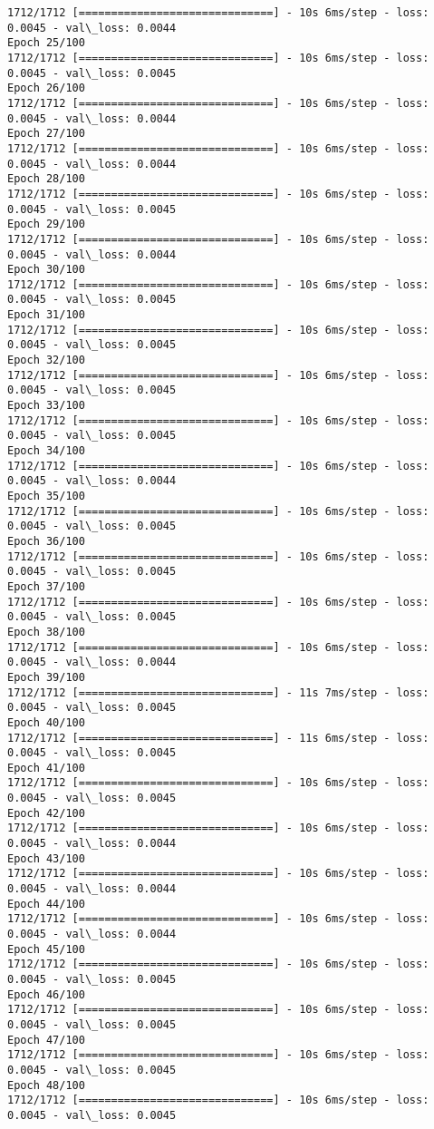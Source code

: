 \documentclass[11pt]{article}
\begin{document}
\begin{Verbatim}[commandchars=\\\{\}]
1712/1712 [==============================] - 10s 6ms/step - loss: 0.0045 - val\_loss: 0.0044
Epoch 25/100
1712/1712 [==============================] - 10s 6ms/step - loss: 0.0045 - val\_loss: 0.0045
Epoch 26/100
1712/1712 [==============================] - 10s 6ms/step - loss: 0.0045 - val\_loss: 0.0044
Epoch 27/100
1712/1712 [==============================] - 10s 6ms/step - loss: 0.0045 - val\_loss: 0.0044
Epoch 28/100
1712/1712 [==============================] - 10s 6ms/step - loss: 0.0045 - val\_loss: 0.0045
Epoch 29/100
1712/1712 [==============================] - 10s 6ms/step - loss: 0.0045 - val\_loss: 0.0044
Epoch 30/100
1712/1712 [==============================] - 10s 6ms/step - loss: 0.0045 - val\_loss: 0.0045
Epoch 31/100
1712/1712 [==============================] - 10s 6ms/step - loss: 0.0045 - val\_loss: 0.0045
Epoch 32/100
1712/1712 [==============================] - 10s 6ms/step - loss: 0.0045 - val\_loss: 0.0045
Epoch 33/100
1712/1712 [==============================] - 10s 6ms/step - loss: 0.0045 - val\_loss: 0.0045
Epoch 34/100
1712/1712 [==============================] - 10s 6ms/step - loss: 0.0045 - val\_loss: 0.0044
Epoch 35/100
1712/1712 [==============================] - 10s 6ms/step - loss: 0.0045 - val\_loss: 0.0045
Epoch 36/100
1712/1712 [==============================] - 10s 6ms/step - loss: 0.0045 - val\_loss: 0.0045
Epoch 37/100
1712/1712 [==============================] - 10s 6ms/step - loss: 0.0045 - val\_loss: 0.0045
Epoch 38/100
1712/1712 [==============================] - 10s 6ms/step - loss: 0.0045 - val\_loss: 0.0044
Epoch 39/100
1712/1712 [==============================] - 11s 7ms/step - loss: 0.0045 - val\_loss: 0.0045
Epoch 40/100
1712/1712 [==============================] - 11s 6ms/step - loss: 0.0045 - val\_loss: 0.0045
Epoch 41/100
1712/1712 [==============================] - 10s 6ms/step - loss: 0.0045 - val\_loss: 0.0045
Epoch 42/100
1712/1712 [==============================] - 10s 6ms/step - loss: 0.0045 - val\_loss: 0.0044
Epoch 43/100
1712/1712 [==============================] - 10s 6ms/step - loss: 0.0045 - val\_loss: 0.0044
Epoch 44/100
1712/1712 [==============================] - 10s 6ms/step - loss: 0.0045 - val\_loss: 0.0044
Epoch 45/100
1712/1712 [==============================] - 10s 6ms/step - loss: 0.0045 - val\_loss: 0.0045
Epoch 46/100
1712/1712 [==============================] - 10s 6ms/step - loss: 0.0045 - val\_loss: 0.0045
Epoch 47/100
1712/1712 [==============================] - 10s 6ms/step - loss: 0.0045 - val\_loss: 0.0045
Epoch 48/100
1712/1712 [==============================] - 10s 6ms/step - loss: 0.0045 - val\_loss: 0.0045

\end{Verbatim}
\end{document}
